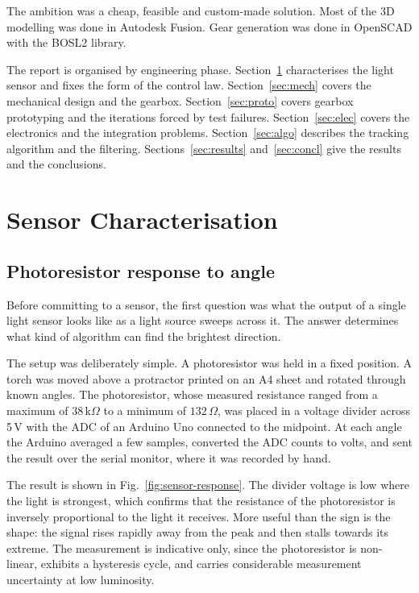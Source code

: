 \documentclass[10pt, conference, letterpaper]{IEEEtran}
\begin{document}
The ambition was a cheap, feasible and custom-made solution. Most of the 3D modelling was done in Autodesk Fusion. Gear generation was done in OpenSCAD with the BOSL2 library.

The report is organised by engineering phase. Section~\ref{sec:sensor} characterises the light sensor and fixes the form of the control law. Section~\ref{sec:mech} covers the mechanical design and the gearbox. Section~\ref{sec:proto} covers gearbox prototyping and the iterations forced by test failures. Section~\ref{sec:elec} covers the electronics and the integration problems. Section~\ref{sec:algo} describes the tracking algorithm and the filtering. Sections~\ref{sec:results} and~\ref{sec:concl} give the results and the conclusions.

\section{Sensor Characterisation}
\label{sec:sensor}

\subsection{Photoresistor response to angle}

Before committing to a sensor, the first question was what the output of a single light sensor looks like as a light source sweeps across it. The answer determines what kind of algorithm can find the brightest direction.

The setup was deliberately simple. A photoresistor was held in a fixed position. A torch was moved above a protractor printed on an A4 sheet and rotated through known angles. The photoresistor, whose measured resistance ranged from a maximum of $38\,\mathrm{k}\Omega$ to a minimum of $132\,\Omega$, was placed in a voltage divider across 5\,V with the ADC of an Arduino Uno connected to the midpoint. At each angle the Arduino averaged a few samples, converted the ADC counts to volts, and sent the result over the serial monitor, where it was recorded by hand.

The result is shown in Fig.~\ref{fig:sensor-response}. The divider voltage is low where the light is strongest, which confirms that the resistance of the photoresistor is inversely proportional to the light it receives. More useful than the sign is the shape: the signal rises rapidly away from the peak and then stalls towards its extreme. The measurement is indicative only, since the photoresistor is non-linear, exhibits a hysteresis cycle, and carries considerable measurement uncertainty at low luminosity.
\end{document}

